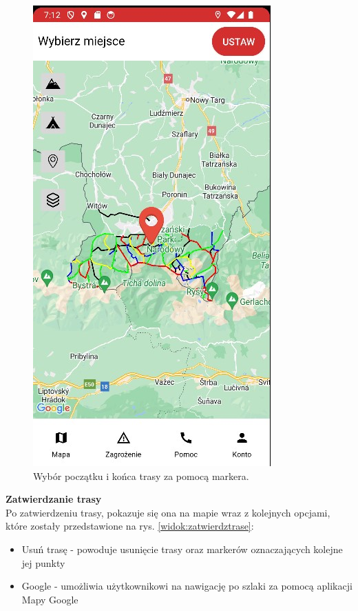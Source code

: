 \begin{figure}[H]
    \centering
    \includegraphics[scale=1.0]{img/test/testmap3.jpg}
    \caption{Wybór początku i końca trasy za pomocą markera.}
    \label{widok:ustawlokalizacje}
\end{figure}

\textbf{Zatwierdzanie trasy} \\
Po zatwierdzeniu trasy, pokazuje się ona na mapie wraz z kolejnych opcjami, które zostały przedstawione na rys. \ref{widok:zatwierdztrase}:
\begin{itemize}
    \item Usuń trasę - powoduje usunięcie trasy oraz markerów oznaczających kolejne jej punkty
    \item Google - umożliwia użytkownikowi na nawigację po szlaki za pomocą aplikacji Mapy Google\\
\end{itemize}

